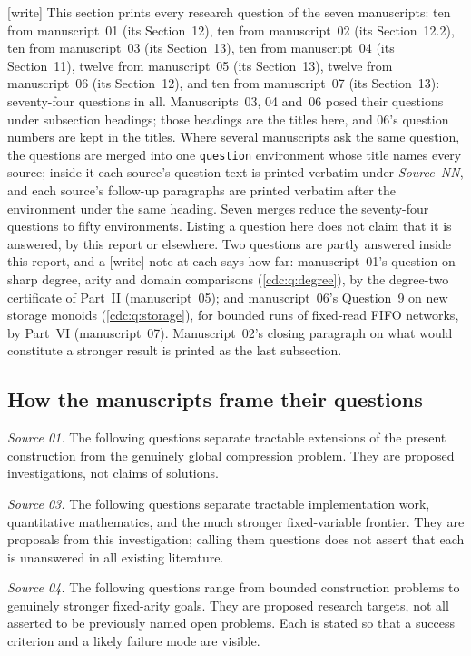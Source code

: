 \documentclass[11pt,a4paper]{article}
\theoremstyle{definition}
\theoremstyle{remark}
\newcommand{\wtag}{\textup{[write]}}%
\begin{document}
\wtag{} This section prints every research question of the seven
manuscripts: ten from manuscript~01 (its Section~12), ten from
manuscript~02 (its Section~12.2), ten from manuscript~03 (its
Section~13), ten from manuscript~04 (its Section~11), twelve from
manuscript~05 (its Section~13), twelve from manuscript~06 (its
Section~12), and ten from manuscript~07 (its Section~13): seventy-four
questions in all. Manuscripts~03, 04 and~06 posed their questions under
subsection headings; those headings are the titles here, and 06's
question numbers are kept in the titles. Where several manuscripts ask
the same question, the questions are merged into one \texttt{question}
environment whose title names every source; inside it each source's
question text is printed verbatim under \emph{Source~NN}, and each
source's follow-up paragraphs are printed verbatim after the environment
under the same heading. Seven merges reduce the seventy-four questions to
fifty environments. Listing a question here does not claim that it is
answered, by this report or elsewhere. Two questions are partly answered
inside this report, and a \wtag{} note at each says how far:
manuscript~01's question on sharp degree, arity and domain comparisons
(\cref{cdc:q:degree}), by the degree-two certificate of Part~II
(manuscript~05); and manuscript~06's Question~9 on new storage monoids
(\cref{cdc:q:storage}), for bounded runs of fixed-read FIFO networks, by
Part~VI (manuscript~07). Manuscript~02's closing paragraph on what would
constitute a stronger result is printed as the last subsection.

\subsection{How the manuscripts frame their questions}

\emph{Source 01.} The following questions separate tractable extensions
of the present construction from the genuinely global compression
problem. They are proposed investigations, not claims of solutions.

\emph{Source 03.} The following questions separate tractable
implementation work, quantitative mathematics, and the much stronger
fixed-variable frontier. They are proposals from this investigation;
calling them questions does not assert that each is unanswered in all
existing literature.

\emph{Source 04.} The following questions range from bounded
construction problems to genuinely stronger fixed-arity goals. They are
proposed research targets, not all asserted to be previously named open
problems. Each is stated so that a success criterion and a likely
failure mode are visible.
\end{document}
